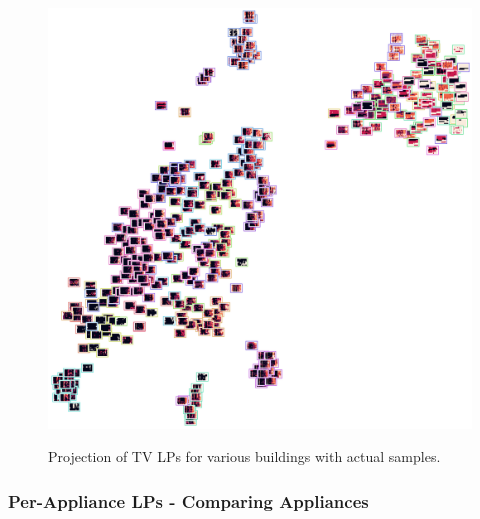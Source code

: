 \begin{figure}[H]
	\centering
	\caption{Projection of TV LPs for various buildings with actual samples.}
	\includegraphics[width=.9\textwidth]{Figures/TSNE/TSNE_per_appliance/img_scatter_refit_television.png}
	\label{fig:tsne_pa_img_scatter_all_tv}
\end{figure}

\subsubsection{Per-Appliance LPs - Comparing Appliances}




